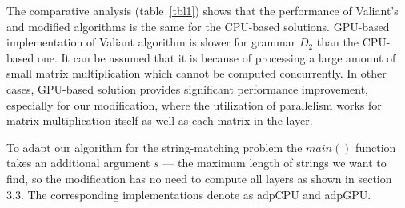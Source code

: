 \begin{table*}[h]
\caption{The comparative analysis}
\label{tbl1}
\centering
{}
\end{table*}

The comparative analysis (table~\ref{tbl1}) shows that the performance of Valiant's and modified algorithms is the same for the CPU-based solutions.
GPU-based implementation of Valiant algorithm is slower for grammar $D_2$ than the CPU-based one. 
It can be assumed that it is because of processing a large amount of small matrix multiplication which cannot be computed concurrently. 
In other cases, GPU-based solution provides significant performance improvement, especially for our modification, where the utilization of parallelism works for matrix multiplication itself as well as each matrix in the layer.

To adapt our algorithm for the string-matching problem the $main()$ function takes an additional argument $s$ ---  the maximum length of strings we want to find, so the modification has no need to compute all layers as shown in section 3.3.
The corresponding implementations denote as  adpCPU and adpGPU.

